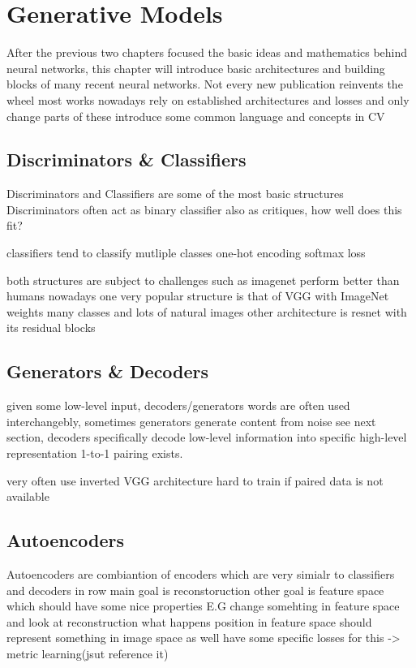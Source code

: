 \setchapterpreamble[u]{\margintoc}
\chapter{Generative Models}
After the previous two chapters focused the basic ideas and mathematics behind neural networks, this chapter will introduce basic architectures and building blocks of many recent neural networks.
Not every new publication reinvents the wheel
most works nowadays rely on established architectures and losses and only change parts of these
introduce some common language and concepts in CV

\section{Discriminators \& Classifiers}
Discriminators and Classifiers are some of the most basic structures
Discriminators often act as binary classifier
also as critiques, how well does this fit?

classifiers tend to classify mutliple classes
one-hot encoding
softmax loss

both structures are subject to challenges such as imagenet
perform better than humans nowadays \cite{something}
one very popular structure is that of VGG with ImageNet weights
many classes and lots of natural images
other architecture is resnet with its residual blocks

\section{Generators \& Decoders}
given some low-level input, decoders/generators 
words are often used interchangebly, sometimes generators generate content from noise see next section, decoders specifically decode low-level information into specific high-level representation 1-to-1 pairing exists.

very often use inverted VGG architecture
hard to train if paired data is not available

\section{Autoencoders}
Autoencoders are combiantion of encoders which are very simialr to classifiers and decoders in row
main goal is reconstoruction 
other goal is feature space which should have some nice properties
E.G change somehting in feature space and look at reconstruction what happens
position in feature space should represent something in image space as well
have some specific losses for this -> metric learning(jsut reference it)

